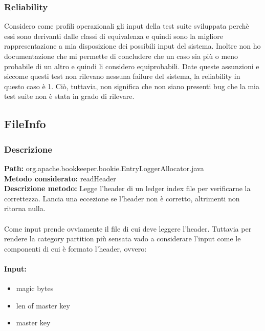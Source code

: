 \documentclass[12pt, a4paper]{article}
\begin{document}
\subsubsection{Reliability}
Considero come profili operazionali gli input della test suite sviluppata perchè essi sono derivanti dalle classi di equivalenza
e quindi sono la migliore rappresentazione a mia disposizione dei possibili input del sistema. Inoltre non ho documentazione che
mi permette di concludere che un caso sia più o meno probabile di un altro e quindi li considero equiprobabili. Date queste 
assunzioni e siccome questi test non rilevano nessuna failure del sistema, la reliability in questo caso è 1. Ciò, tuttavia,
 non significa che non siano presenti bug che la mia test suite non è stata in grado di rilevare.

\subsection{FileInfo}
\subsubsection{Descrizione}
\textbf{Path:} org.apache.bookkeeper.bookie.EntryLoggerAllocator.java \\
\textbf{Metodo considerato:} readHeader \\ 
\textbf{Descrizione metodo:} Legge l'header di un ledger index file per verificarne la correttezza.
Lancia una eccezione se l'header non è corretto, altrimenti non ritorna nulla.\\ \\
Come input prende ovviamente il file di cui deve leggere l'header. Tuttavia per rendere la category partition più sensata
vado a considerare l'input come le componenti di cui è formato l'header, ovvero:
\paragraph{Input:}
\begin{itemize}
  \item magic bytes
  \item len of master key
  \item master key
\end{itemize}
\end{document}
